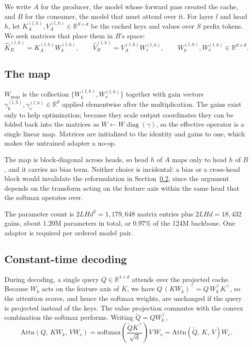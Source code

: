 \documentclass[11pt]{article}
\begin{document}
We write $A$ for the producer, the model whose forward pass created the cache, and $B$ for
the consumer, the model that must attend over it. For layer $l$ and head $h$, let
$K_A^{(l,h)}, V_A^{(l,h)} \in \mathbb{R}^{S \times d}$ be the cached keys and values over
$S$ prefix tokens. We seek matrices that place them in $B$'s space:
\[
  \hat{K}_B^{(l,h)} = K_A^{(l,h)} W_k^{(l,h)}, \qquad
  \hat{V}_B^{(l,h)} = V_A^{(l,h)} W_v^{(l,h)} ,
  \qquad W_k^{(l,h)}, W_v^{(l,h)} \in \mathbb{R}^{d \times d}.
\]

\subsection{The map}

$W_{\mathrm{map}}$ is the collection $\{W_k^{(l,h)}, W_v^{(l,h)}\}$ together with gain
vectors $\gamma_k^{(l,h)}, \gamma_v^{(l,h)} \in \mathbb{R}^{d}$ applied elementwise after
the multiplication. The gains exist only to help optimization; because they scale output
coordinates they can be folded back into the matrices as
$W \leftarrow W \operatorname{diag}(\gamma)$, so the effective operator is a single linear
map. Matrices are initialized to the identity and gains to one, which makes the untrained
adapter a no-op.

The map is block-diagonal across heads, so head $h$ of $A$ maps only to head $h$ of $B$, and
it carries no bias term. Neither choice is incidental: a bias or a cross-head block would
invalidate the reformulation in Section~\ref{sec:assoc}, since the argument depends on the
transform acting on the feature axis within the same head that the softmax operates over.

The parameter count is $2LHd^2 = 1{,}179{,}648$ matrix entries plus $2LHd = 18{,}432$ gains,
about $1.20$M parameters in total, or $0.97\%$ of the 124M backbone. One adapter is required
per ordered model pair.

\subsection{Constant-time decoding}
\label{sec:assoc}

During decoding, a single query $Q \in \mathbb{R}^{1 \times d}$ attends over the projected
cache. Because $W_k$ acts on the feature axis of $K$, we have
$Q\,(K W_k)^{\!\top} = Q\, W_k^{\!\top} K^{\!\top}$, so the attention scores, and hence the
softmax weights, are unchanged if the query is projected instead of the keys. The value
projection commutes with the convex combination the softmax performs. Writing
$\tilde{Q} = Q W_k^{\!\top}$,
\begin{equation}
\mathrm{Attn}\!\left(Q,\, K W_k,\, V W_v\right)
= \mathrm{softmax}\!\left(\frac{\tilde{Q} K^{\!\top}}{\sqrt{d}}\right) V \, W_v
= \mathrm{Attn}\!\left(\tilde{Q},\, K,\, V\right) W_v .
\label{eq:assoc}
\end{equation}
\end{document}

